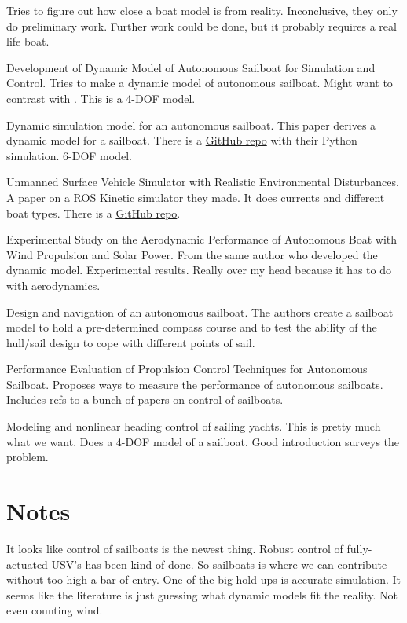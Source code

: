\documentclass[conference]{IEEEtran}
\begin{document}
\cite{Huang2017} Tries to figure out how close a boat model is from reality. Inconclusive, they only do preliminary work. Further work could be done, but it probably requires a real life boat.

\cite{Setiawan2020} Development of Dynamic Model of Autonomous Sailboat for Simulation and Control. Tries to make a dynamic model of autonomous sailboat. Might want to contrast with \cite{Buehler2018}. This is a 4-DOF model.

\cite{Buehler2018} Dynamic simulation model for an autonomous sailboat. This paper derives a dynamic model for a sailboat. There is a \href{https://github.com/simonkohaut/stda-sailboat-simulator/tree/master/src}{GitHub repo} with their Python simulation. 6-DOF model.

\cite{Paravisi2019} Unmanned Surface Vehicle Simulator with Realistic Environmental Disturbances. A paper on a ROS Kinetic simulator they made. It does currents and different boat types. There is a \href{https://github.com/disaster-robotics-proalertas/usv_sim_lsa}{GitHub repo}.

\cite{Setiawan2020} Experimental Study on the Aerodynamic Performance of Autonomous Boat with Wind Propulsion and Solar Power. From the same author who developed the dynamic model. Experimental results. Really over my head because it has to do with aerodynamics.


\cite{Sauze2006} Design and navigation of an autonomous sailboat. The authors create a sailboat model to hold a pre-determined compass course and to test the ability of the hull/sail design to cope with different points of sail.


\cite{DosSantos2020} Performance Evaluation of Propulsion Control Techniques for Autonomous Sailboat. Proposes ways to measure the performance of autonomous sailboats. Includes refs to a bunch of papers on control of sailboats.

\cite{Xiao2014} Modeling and nonlinear heading control of sailing yachts. This is pretty much what we want. Does a 4-DOF model of a sailboat. Good introduction surveys the problem.


\section{Notes}
It looks like control of sailboats is the newest thing. Robust control of fully-actuated USV's has been kind of done. So sailboats is where we can contribute without too high a bar of entry. One of the big hold ups is accurate simulation. It seems like the literature is just guessing what dynamic models fit the reality. Not even counting wind.
\end{document}
